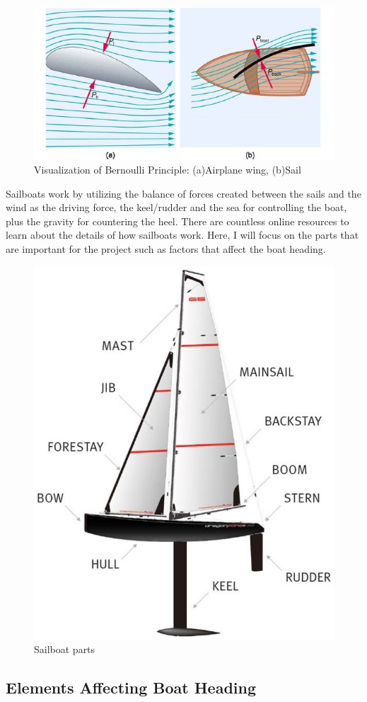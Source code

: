 \documentclass[12pt,twoside]{report}
\begin{document}
\begin{figure}[h]
\centering
\includegraphics[width = 0.8\hsize]{figures/sailing/sail-bernoulli.jpg}
\caption{Visualization of Bernoulli Principle: (a)Airplane wing, (b)Sail \cite{bernoulli}}
\label{fig:bernoulli}
\end{figure}

Sailboats work by utilizing the balance of forces created between the sails and the wind as the driving force, the keel/rudder and the sea for controlling the boat, plus the gravity for countering the heel. There are countless online resources to learn about the details of how sailboats work. Here, I will focus on the parts that are important for the project such as factors that affect the boat heading.

\begin{figure}[]
\centering
\includegraphics[width = 0.5\hsize]{figures/sailing/sailboat-parts.png}
\caption{Sailboat parts \cite{sail-parts}}
\label{fig:sail-parts}
\end{figure}

\subsection{Elements Affecting Boat Heading}
\end{document}
